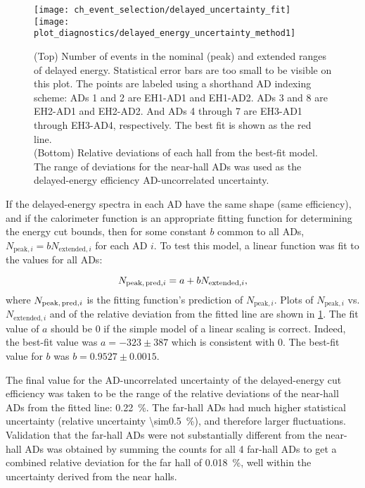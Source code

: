 \begin{figure}
    \centering
    \texttt{[image: ch\_event\_selection/delayed\_uncertainty\_fit]}\\
    \texttt{[image: plot\_diagnostics/delayed\_energy\_uncertainty\_method1]}
    \caption[Delayed energy efficiency uncertainty]{
        (Top) Number of events in the nominal (peak)
        and extended ranges of delayed energy.
        Statistical error bars are too small to be visible on this plot.
        The points are labeled using a shorthand AD indexing scheme:
        ADs 1 and 2 are EH1-AD1 and EH1-AD2. ADs 3 and 8 are EH2-AD1 and EH2-AD2.
        And ADs 4 through 7 are EH3-AD1 through EH3-AD4, respectively.
        The best fit is shown as the red line.\\
        (Bottom) Relative deviations of each hall from the best-fit model.
        The range of deviations for the near-hall ADs
        was used as the delayed-energy efficiency AD-uncorrelated uncertainty.
    }
    \label{fig:delayed_eff_unc_fit}
\end{figure}


If the delayed-energy spectra in each AD have the same shape (same efficiency),
and if the calorimeter function is an appropriate fitting function
for determining the energy cut bounds,
then for some constant $b$ common to all ADs,
$N_{\text{peak},i} = b N_{\text{extended},i}$ for each AD $i$.
To test this model, a linear function was fit
to the values for all ADs:

\begin{equation}
    N_{\text{peak,\,pred},i} = a + b N_{\text{extended},i},
\end{equation}
where $N_{\text{peak,\,pred},i}$ is the fitting function's prediction
of $N_{\text{peak},i}$.
Plots of $N_{\text{peak},i}$ vs. $N_{\text{extended},i}$ and of the
relative deviation from the fitted line are shown in \cref{fig:delayed_eff_unc_fit}.
The fit value of $a$ should be $0$ if the simple model of
a linear scaling is correct.
Indeed, the best-fit value was $a = -323 \pm 387$
which is consistent with $0$.
The best-fit value for $b$ was $b = 0.9527 \pm 0.0015$.

The final value for the AD-uncorrelated uncertainty
of the delayed-energy cut efficiency was taken to be
the range of the relative deviations
of the near-hall ADs from the fitted line: \SI{0.22}{\percent}.
The far-hall ADs had much higher statistical uncertainty
(relative uncertainty \SI{\sim0.5}{\percent}),
and therefore larger fluctuations.
Validation that the far-hall ADs were not
substantially different from the near-hall ADs was obtained by
summing the counts for all 4 far-hall ADs to get
a combined relative deviation for the far hall of \SI{0.018}{\percent},
well within the uncertainty derived from the near halls.

